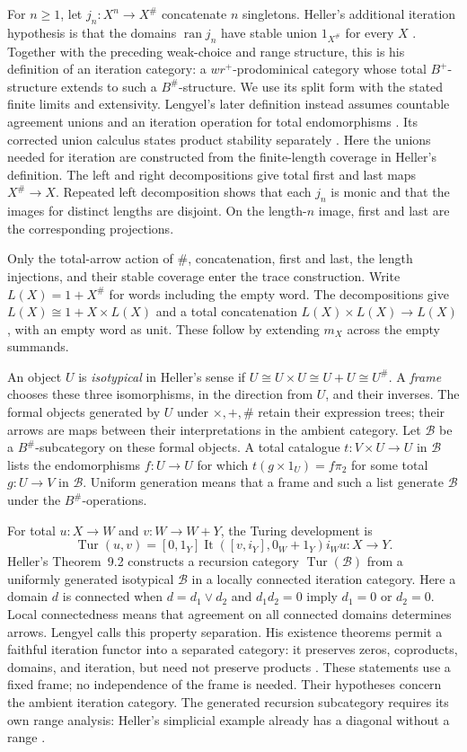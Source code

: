 \documentclass[11pt]{article}
\theoremstyle{definition}\newtheorem{definition}[theorem]{Definition}
\theoremstyle{remark}\newtheorem{remark}[theorem]{Remark}
\newcommand{\ran}{\operatorname{ran}}
\newcommand{\It}{\operatorname{It}}
\begin{document}
For $n\ge1$, let $j_n:X^n\to X^\#$ concatenate $n$ singletons.
Heller's additional iteration hypothesis is that the domains
$\ran j_n$ have stable union $1_{X^\#}$ for every $X$
\cite[\S7]{Heller}. Together with the preceding weak-choice and
range structure, this is his definition of an iteration category:
a $wr^+$-prodominical category whose total $B^+$-structure extends
to such a $B^\#$-structure.
We use its split form with the stated finite limits and extensivity.
Lengyel's later definition instead assumes countable agreement
unions and an iteration operation for total endomorphisms
\cite[\S2.6, pp.~14--15]{Lengyel}. Its corrected union calculus
states product stability separately \cite[\S11.2]{Repairs}.
Here the unions needed for iteration are constructed from the
finite-length coverage in Heller's definition.
The left and right decompositions give total first and last maps
$X^\#\to X$. Repeated left decomposition shows that each $j_n$ is
monic and that the images for distinct lengths are disjoint. On the
length-$n$ image, first and last are the corresponding projections.

Only the total-arrow action of $\#$, concatenation, first and last,
the length injections, and their stable coverage enter the trace
construction. Write $L(X)=1+X^\#$ for words including the empty
word. The decompositions give $L(X)\cong1+X\times L(X)$ and a
total concatenation $L(X)\times L(X)\to L(X)$, with an empty word
as unit. These follow by extending $m_X$ across the empty summands.

An object $U$ is \emph{isotypical} in Heller's sense if
$U\cong U\times U\cong U+U\cong U^\#$. A \emph{frame} chooses
these three isomorphisms, in the direction from $U$, and their
inverses. The formal objects generated by $U$ under $\times,+,\#$
retain their expression trees; their arrows are maps between their
interpretations in the ambient category. Let $\mathscr B$ be
a $B^\#$-subcategory on these formal objects.
A total catalogue $t:V\times U\to U$ in $\mathscr B$
lists the endomorphisms $f:U\to U$ for which
$t(g\times1_U)=f\pi_2$ for some total $g:U\to V$ in
$\mathscr B$. Uniform generation means that a frame and such a
list generate $\mathscr B$ under the $B^\#$-operations.

For total $u:X\to W$ and $v:W\to W+Y$, the Turing development is
\[
 \operatorname{Tur}(u,v)
 =[0,1_Y]\It([v,i_Y],0_W+1_Y)i_Wu:X\to Y.
\]
Heller's Theorem~9.2 constructs a recursion category
$\operatorname{Tur}(\mathscr B)$ from a uniformly generated
isotypical $\mathscr B$ in a locally connected iteration category.
Here a domain $d$ is connected when $d=d_1\vee d_2$ and
$d_1d_2=0$ imply $d_1=0$ or $d_2=0$. Local connectedness means
that agreement on all connected domains determines arrows.
Lengyel calls this property separation. His existence theorems
permit a faithful iteration functor into a separated category:
it preserves zeros, coproducts, domains, and iteration, but need
not preserve products \cite{Lengyel,Repairs}.
These statements use a fixed frame; no independence of the frame
is needed. Their hypotheses concern the
ambient iteration category. The generated recursion subcategory
requires its own range analysis: Heller's simplicial example already
has a diagonal without a range \cite[\S10, Example~5]{Heller}.
\end{document}
